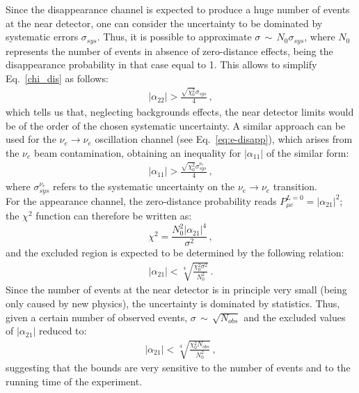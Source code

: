 \documentclass[11pt,a4paper]{article}
\begin{document}
Since the disappearance channel is expected to produce a huge number of events at the near detector, one can consider the uncertainty to be dominated by systematic errors $\sigma_{sys}$. Thus, it is possible to approximate $\sigma\,\sim\,N_0 \sigma_{sys}$, where $N_0$ represents the number of events in absence of zero-distance effects, being the disappearance probability in that case equal to 1. This allows to simplify  Eq.~\ref{chi_dis} as follows:
\begin{eqnarray}
|\alpha_{22}|>\frac{\sqrt{\chi^2_0}\sigma_{sys}}{4}\,,
\end{eqnarray}
which tells us that, neglecting backgrounds effects, the near detector limits would be of the order of the chosen systematic uncertainty. A similar approach can be used for the $\nu_e\to\nu_e$ oscillation channel (see Eq.~\ref{eq:e-disapp}), which arises from the $\nu_e$ beam  contamination, obtaining an inequality for $|\alpha_{11}|$ of the similar form:
\begin{eqnarray}
|\alpha_{11}|>\frac{\sqrt{\chi^2_0}\sigma_{sys}^{\nu_e}}{4}\,,
\label{a11_ND}
\end{eqnarray}
where $\sigma_{sys}^{\nu_e}$ refers to the systematic uncertainty on the $\nu_e\to\nu_e$ transition.\\
For the appearance channel, the zero-distance probability reads $P_{\mu e}^{L=0}=|\alpha_{21}|^2$; the $\chi^2$ function can therefore be written as:
\begin{equation}
    \chi^2=\frac{N_0^2 |\alpha_{21}|^4}{\sigma^2}\,,
\end{equation}
and the excluded region is expected to be determined by the following relation:
\begin{eqnarray}
|\alpha_{21}|<\sqrt[4]{\frac{\chi_0^2 \sigma^2}{N_0^2}}\,.
\end{eqnarray}
Since the number of events at the near detector is in principle very small (being only caused by new physics), the uncertainty is dominated by statistics. Thus, given a certain number of observed events, $\sigma\,\sim\,\sqrt{N_{obs}}$ and the excluded values of $|\alpha_{21}|$ reduced to:
\begin{eqnarray}
 |\alpha_{21}|<\sqrt[4]{\frac{\chi_0^2 N_{obs}}{N_0^2}}\,,
 \label{mue_ND}
\end{eqnarray}
suggesting that the bounds are very sensitive to the number of events and to the  running time of the experiment. 
\end{document}

